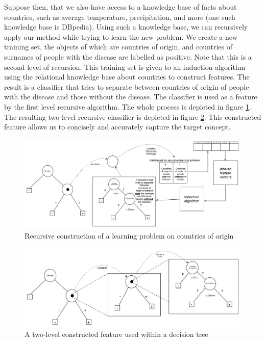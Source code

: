 \documentclass{article}
\theoremstyle{definition}
\begin{document}
Suppose then, that we also have access to a knowledge base of facts about countries, such as average temperature, precipitation, and more (one such knowledge base is DBpedia). Using such a knowledge base, we can recursively apply our method while trying to learn the new problem. We create a new training set, the objects of which are countries of origin, and countries of surnames of people with the disease are labelled as positive. Note that this is a second level of recursion. This training set is given to an induction algorithm using the relational knowledge base about countries to construct features. The result is a classifier that tries to separate between countries of origin of people with the disease and those without the disease. The classifier is used as a feature by the first level recursive algorithm. The whole process is depicted in figure \ref{fig:moving_to_lvl2}. The resulting two-level recursive classifier is depicted in figure \ref{fig:lvl2_tree}. This constructed feature allows us to concisely and accurately capture the target concept.

\begin{figure}[t]
	\centering
	\includegraphics[width=\linewidth]{fig4.pdf}
	\caption{Recursive construction of a learning problem on countries of origin}
	\label{fig:moving_to_lvl2}
\end{figure}

\begin{figure}[t]
	\centering
	\includegraphics[width=\linewidth]{fig3.pdf}
	\caption{A two-level constructed feature used within a decision tree}
	\label{fig:lvl2_tree}
\end{figure}
\end{document}
